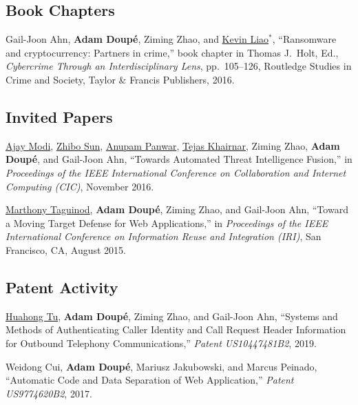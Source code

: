 \documentclass[11pt,letterpaper,sans]{moderncv}
\begin{document}
\subsection{Book Chapters}

\begin{etaremune}

\item Gail-Joon Ahn, \textbf{Adam Doup\'e}, Ziming Zhao, and
  \underline{Kevin Liao}$^*$, ``Ransomware and cryptocurrency: Partners in
  crime,'' book chapter in Thomas J.\ Holt, Ed., \emph{Cybercrime
    Through an Interdisciplinary Lens}, pp.\ 105--126, Routledge
  Studies in Crime and Society, Taylor \& Francis Publishers, 2016.

\end{etaremune}

\subsection{Invited Papers}

\begin{etaremune}

\item \underline{Ajay Modi}, \underline{Zhibo Sun}, \underline{Anupam
  Panwar}, \underline{Tejas Khairnar}, Ziming Zhao, \textbf{Adam
  Doup\'e}, and Gail-Joon Ahn, ``Towards Automated Threat Intelligence
  Fusion,'' in \emph{Proceedings of the IEEE International Conference
    on Collaboration and Internet Computing (CIC)}, November 2016.

\item \underline{Marthony Taguinod}, \textbf{Adam Doup\'e}, Ziming
  Zhao, and Gail-Joon Ahn, ``Toward a Moving Target Defense for Web
  Applications,'' in \emph{Proceedings of the IEEE International
    Conference on Information Reuse and Integration (IRI)}, San
  Francisco, CA, August 2015.
\end{etaremune}

\subsection{Patent Activity}

\begin{etaremune}

  \item \underline{Huahong Tu}, \textbf{Adam Doup\'e}, Ziming Zhao,
    and Gail-Joon Ahn, ``Systems and Methods of Authenticating Caller
    Identity and Call Request Header Information for Outbound
    Telephony Communications,'' \emph{Patent US10447481B2}, 2019.

  \item Weidong Cui, \textbf{Adam Doup\'e}, Mariusz Jakubowski, and Marcus
    Peinado, ``Automatic Code and Data Separation of Web
    Application,'' \emph{Patent US9774620B2}, 2017.

\end{etaremune}
\end{document}
